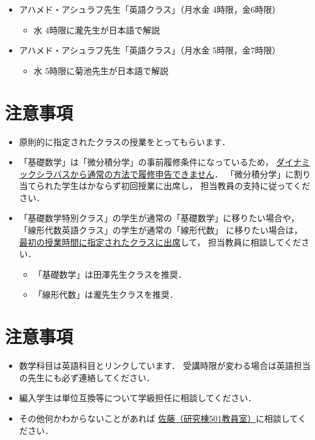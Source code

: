 \documentclass[a4j,landscape,25pt]{jsarticle}
\begin{document}
\begin{itemize}
 \item アハメド・アシュラフ先生「英語クラス」（月水金 4時限，金6時限）
\begin{itemize}
 \item 水 4時限に瀧先生が日本語で解説
\end{itemize}
 \item アハメド・アシュラフ先生「英語クラス」（月水金 5時限，金7時限）
\begin{itemize}
 \item 水 5時限に菊池先生が日本語で解説
\end{itemize}
\end{itemize}

\section{注意事項}

\begin{itemize}
 \item 原則的に指定されたクラスの授業をとってもらいます．
 \item 「基礎数学」は「微分積分学」の事前履修条件になっているため，
\underline{ダイナミックシラバスから通常の方法で履修申告できません}．
「微分積分学」に割り当てられた学生はかならず初回授業に出席し，
担当教員の支持に従ってください．
 \item 「基礎数学特別クラス」の学生が通常の「基礎数学」に移りたい場合や，
「線形代数英語クラス」の学生が通常の「線形代数」
に移りたい場合は，\underline{最初の授業時間に指定されたクラスに出席}して，
担当教員に相談してください．
\begin{itemize}
 \item 「基礎数学」は田澤先生クラスを推奨．
 \item 「線形代数」は瀧先生クラスを推奨．
\end{itemize}

\end{itemize}

\section{注意事項}

\begin{itemize}
 \item 数学科目は英語科目とリンクしています．
受講時限が変わる場合は英語担当の先生にも必ず連絡してください．
 \item 編入学生は単位互換等について学級担任に相談してください．
 \item その他何かわからないことがあれば
\underline{佐藤（研究棟501教員室）}に相談してください．
\end{itemize}
\end{document}
